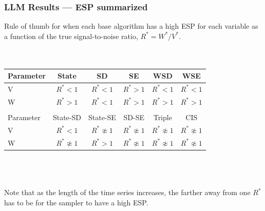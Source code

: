 \documentclass[xcolor=dvipsnames]{beamer}
\begin{document}
\begin{frame}
\frametitle{LLM Results --- ESP summarized}
Rule of thumb for when each base algorithm has a high ESP for each variable as a function of the true signal-to-noise ratio, $R^*=W^*/V^*$. \\~\\~\\
 \begin{center}
  \begin{tabular}{lccccc}\hline
    Parameter & State & SD & SE & WSD & WSE \\\hline
    V & $R^* < 1$ & $R^* < 1$ & $R^* > 1$ & $R^* < 1$ & $R^* < 1$\\
    W & $R^* > 1$ & $R^* < 1$ & $R^* > 1$ & $R^* > 1$ & $R^* > 1$ \\
      &           &          &           &           &           \\\hline
    Parameter & State-SD        & State-SE       & SD-SE        & Triple            & CIS \\\hline
    V         & $R^* < 1$           & $R^* \not\approx 1$ & $R^* \not\approx 1$ & $R^* \not\approx 1$ & $R^* \not\approx 1$ \\
    W         & $R^* \not\approx 1$ & $R^* > 1$           & $R^* \not\approx 1$ & $R^* \not\approx 1$ & $R^* \not\approx 1$\\\hline
  \end{tabular}
\end{center}\\~\\~\\

Note that as the length of the time series increases, the farther away from one $R^*$ has to be for the sampler to have a high ESP.

\end{frame}
\end{document}
